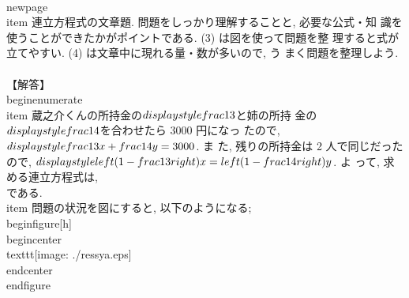  \\newpage
 \\item 連立方程式の文章題. 問題をしっかり理解することと, 必要な公式・知
       識を使うことができたかがポイントである. (3) は図を使って問題を整
       理すると式が立てやすい. (4) は文章中に現れる量・数が多いので, う
       まく問題を整理しよう. \\\\
       【解答】
       \\begin{enumerate}
	\\item 蔵之介くんの所持金の$\\displaystyle \\frac{1}{3}$と姉の所持
	      金の$\\displaystyle \\frac{1}{4}$を合わせたら 3000 円になっ
	      たので, $\\displaystyle \\frac{1}{3}x+\\frac{1}{4}y=3000$. ま
	      た, 残りの所持金は 2 人で同じだったので, $\\displaystyle
	      \\left(1-\\frac{1}{3}\\right)x=\\left(1-\\frac{1}{4}\\right)y$. よ
	      って, 求める連立方程式は,
	      \\[
	       \\begin{cases}
	        \\displaystyle \\frac{1}{3}x+\\frac{1}{4}y=3000\\\\
		\\displaystyle \\frac{2}{3}x=\\frac{3}{4}y
	       \\end{cases}
	      \\]
	      である. 
	\\item 問題の状況を図にすると, 以下のようになる;
	      \\begin{figure}[h]
	       \\begin{center}
		\\texttt{[image: ./ressya.eps]}
	       \\end{center}
	      \\end{figure} \\\\
